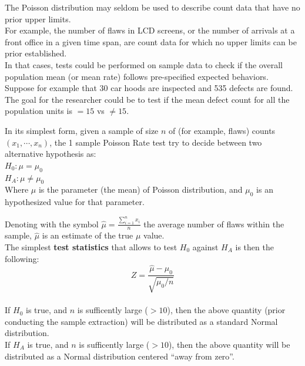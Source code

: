 
\begin{frame}
  \vspace{.25cm}
  The Poisson distribution may seldom be used to describe count data that have no prior upper limits.\\
  \vspace{.25cm}
  For example, the number of flaws in LCD screens, or the number of arrivals at a front office in a given time span, are count data for which no upper limits can be prior established.\\
  \vspace{.25cm}
  In that cases, tests could be performed on sample data to check if the overall population mean (or mean rate) follows pre-specified expected behaviors.\\
  \vspace{.25cm}
  Suppose for example that 30 car hoods are inspected and 535 defects are found. The goal for the researcher could be to test if the mean defect count for all the population units is $=15$ vs $\neq 15$. 
\end{frame}

\begin{frame}
  \vspace{.75cm}
  In its simplest form, given a sample of size $n$ of (for example, flaws) counts $(x_1, \cdots, x_n)$, the 1 sample Poisson Rate test try to decide between two alternative hypothesis as:\\
  \vspace{.5cm}
  $H_0: \mu=\mu_0$\\
  $H_A: \mu \neq \mu_0$\\
  \vspace{.5cm}
  Where $\mu$ is the parameter (the mean) of Poisson distribution, and $\mu_0$ is an hypothesized value for that parameter.\\
\end{frame}

\begin{frame}
  \vspace{.25cm}
  Denoting with the symbol $ \hat{\mu} = \frac{\sum_{i=1}^nx_i}{n}$ the average number of flaws within the sample, $\hat\mu$ is an estimate of the true $\mu$ value. \\
  \vspace{.25cm}
  The simplest \textbf{test statistics} that allows to test $H_0$ against $H_A$ is then the following:
  $$ Z=\frac{\hat{\mu} - \mu_0}{\sqrt{\mu_0/ n}} $$\\
  \vspace{.25cm}
  If $H_0$ is true, and $n$ is sufficently large ($>10$), then the above quantity (prior conducting the sample extraction) will be distributed as a standard Normal distribution.\\
  \vspace{.25cm}
  If $H_A$ is true, and $n$ is sufficently large  ($>10$), then the above quantity will be distributed as a Normal distribution centered ``away from zero''.
\end{frame}


